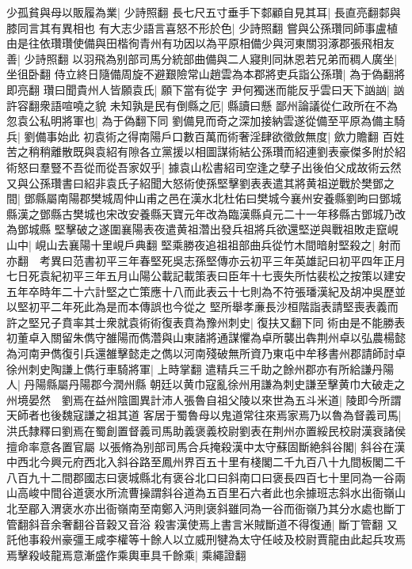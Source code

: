 少孤貧與母以販履為業|{
	少詩照翻}
長七尺五寸垂手下䣛顧自見其耳|{
	長直亮翻䣛與膝同言其有異相也}
有大志少語言喜怒不形於色|{
	少詩照翻}
嘗與公孫瓚同師事盧植由是往依瓚瓚使備與田楷徇青州有功因以為平原相備少與河東關羽涿郡張飛相友善|{
	少詩照翻}
以羽飛為别部司馬分統部曲備與二人寢則同牀恩若兄弟而稠人廣坐|{
	坐徂卧翻}
侍立終日隨備周旋不避艱險常山趙雲為本郡將吏兵詣公孫瓚|{
	為于偽翻將即亮翻}
瓚曰聞貴州人皆願袁氏|{
	願下當有從字}
尹何獨迷而能反乎雲曰天下訩訩|{
	訩許容翻衆語喧嘵之貌}
未知孰是民有倒縣之厄|{
	縣讀曰懸}
鄙州論議從仁政所在不為忽袁公私明將軍也|{
	為于偽翻下同}
劉備見而奇之深加接納雲遂從備至平原為備主騎兵|{
	劉備事始此}
初袁術之得南陽戶口數百萬而術奢淫肆欲徵斂無度|{
	歛力贍翻}
百姓苦之稍稍離散既與袁紹有隙各立黨援以相圖謀術結公孫瓚而紹連劉表豪傑多附於紹術怒曰羣豎不吾從而從吾家奴乎|{
	據袁山松書紹司空逢之孽子出後伯父成故術云然}
又與公孫瓚書曰紹非袁氏子紹聞大怒術使孫堅擊劉表表遣其將黄祖逆戰於樊鄧之間|{
	鄧縣屬南陽郡樊城周仲山甫之邑在漢水北杜佑曰樊城今襄州安養縣劉昫曰鄧城縣漢之鄧縣古樊城也宋改安養縣天寶元年改為臨漢縣貞元二十一年移縣古鄧城乃改為鄧城縣}
堅擊破之遂圍襄陽表夜遣黄祖濳出發兵祖將兵欲還堅逆與戰祖敗走竄峴山中|{
	峴山去襄陽十里峴戶典翻}
堅乘勝夜追祖祖部曲兵從竹木間暗射堅殺之|{
	射而亦翻　考異曰范書初平三年春堅死吳志孫堅傳亦云初平三年英雄記曰初平四年正月七日死袁紀初平三年五月山陽公載記載策表曰臣年十七喪失所怙裴松之按策以建安五年卒時年二十六計堅之亡策應十八而此表云十七則為不符張璠漢紀及胡冲吳歷並以堅初平二年死此為是而本傳誤也今從之}
堅所舉孝亷長沙桓階詣表請堅喪表義而許之堅兄子賁率其士衆就袁術術復表賁為豫州刺史|{
	復扶又翻下同}
術由是不能勝表　初董卓入關留朱儁守雒陽而儁濳與山東諸將通謀懼為卓所襲出犇荆州卓以弘農楊懿為河南尹儁復引兵還雒擊懿走之儁以河南殘破無所資乃東屯中牟移書州郡請師討卓徐州刺史陶謙上儁行車騎將軍|{
	上時掌翻}
遣精兵三千助之餘州郡亦有所給謙丹陽人|{
	丹陽縣屬丹陽郡今潤州縣}
朝廷以黄巾寇亂徐州用謙為刺史謙至擊黄巾大破走之州境晏然　劉焉在益州陰圖異計沛人張魯自祖父陵以來世為五斗米道|{
	陵即今所謂天師者也後魏寇謙之祖其道}
客居于蜀魯母以鬼道常往來焉家焉乃以魯為督義司馬|{
	洪氏隸釋曰劉焉在蜀創置督義司馬助義褒義校尉劉表在荆州亦置綏民校尉漢衰諸侯擅命率意各置官屬}
以張脩為别部司馬合兵掩殺漢中太守蘇固斷絶斜谷閣|{
	斜谷在漢中西北今興元府西北入斜谷路至鳳州界百五十里有棧閣二千九百八十九間板閣二千八百九十二間郡國志曰褒城縣北有褒谷北口曰斜南口曰褒長四百七十里同為一谷兩山高峻中間谷道褒水所流曹操謂斜谷道為五百里石六者此也余據班志斜水出衙嶺山北至郿入渭褒水亦出衙嶺南至南鄭入沔則褒斜雖同為一谷而衙嶺乃其分水處也斷丁管翻斜音余奢翻谷音穀又音浴}
殺害漢使焉上書言米賊斷道不得復通|{
	斷丁管翻}
又託他事殺州豪彊王咸李權等十餘人以立威刑犍為太守任岐及校尉賈龍由此起兵攻焉焉擊殺岐龍焉意漸盛作乘輿車具千餘乘|{
	乘繩證翻}
